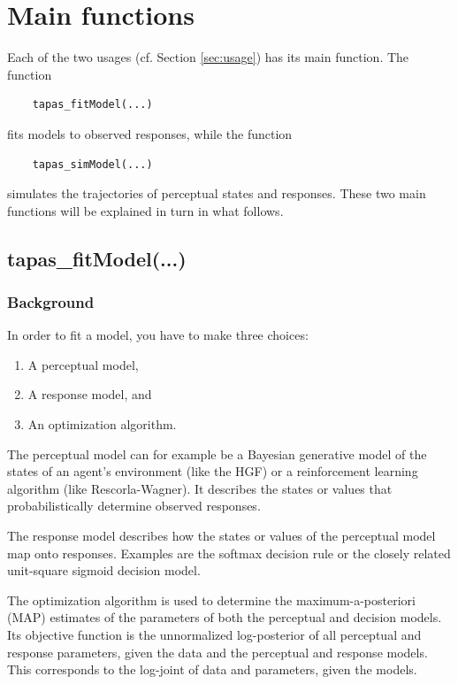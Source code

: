 \documentclass[11pt,a4paper]{article}
\numberwithin{equation}{section}
\begin{document}
\section{Main functions}
\label{sec:mainfunc}

Each of the two usages (cf. Section \ref{sec:usage}) has its main function. The function

\begin{verbatim}
    tapas_fitModel(...)
\end{verbatim}

fits models to observed responses, while the function

\begin{verbatim}
    tapas_simModel(...)
\end{verbatim}

simulates the trajectories of perceptual states and responses. These
two main functions will be explained in turn in what follows.

\subsection{tapas\_fitModel(...)}
\label{sec:fitmodel}

\subsubsection{Background}

In order to fit a model, you have to make three choices:

\begin{enumerate}
\item A perceptual model,
\item A response model, and
\item An optimization algorithm.
\end{enumerate}

The perceptual model can for example be a Bayesian generative model of
the states of an agent's environment (like the HGF) or a reinforcement
learning algorithm (like Rescorla-Wagner). It describes the
states or values that probabilistically determine observed responses.

The response model describes how the states or values of the
perceptual model map onto responses. Examples are the softmax decision
rule or the closely related unit-square sigmoid decision model.

The optimization algorithm is used to determine the
maximum-a-posteriori (MAP) estimates of the parameters of both the
perceptual and decision models. Its objective function is the
unnormalized log-posterior of all perceptual and response
parameters, given the data and the perceptual and response
models. This corresponds to the log-joint of data and parameters,
given the models.
\end{document}
